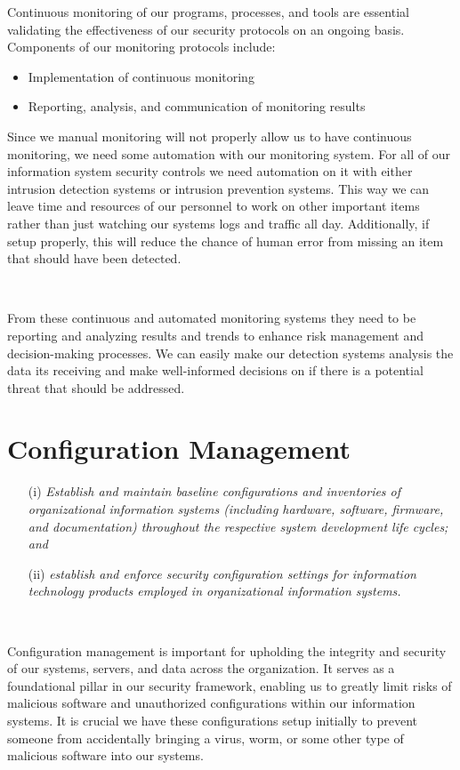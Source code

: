 \documentclass[12pt,a4paper]{report}
\begin{document}
Continuous monitoring of our programs, processes, and tools are essential validating the effectiveness of our security protocols on an ongoing basis. 
Components of our monitoring protocols include:
\begin{itemize}
 \item Implementation of continuous monitoring
 \item Reporting, analysis, and communication of monitoring results
\end{itemize}

Since we manual monitoring will not properly allow us to have continuous monitoring, we need some automation with our monitoring system.
For all of our information system security controls we need automation on it with either intrusion detection systems or intrusion prevention systems.
This way we can leave time and resources of our personnel to work on other important items rather than just watching our systems logs and traffic all day.
Additionally, if setup properly, this will reduce the chance of human error from missing an item that should have been detected.

\

From these continuous and automated monitoring systems they need to be reporting and analyzing results and trends to enhance risk management and decision-making processes.
We can easily make our detection systems analysis the data its receiving and make well-informed decisions on if there is a potential threat that should be addressed. 

\chapter{Configuration Management}
\begin{enumerate}
 \item[(i)] \textit{Establish and maintain baseline configurations and inventories of organizational information systems (including hardware, software, firmware, and documentation) throughout the respective system development life cycles; and}
 \item[(ii)] \textit{establish and enforce security configuration settings for information technology products employed in organizational information systems.}
\end{enumerate}

\

Configuration management is important for upholding the integrity and security of our systems, servers, and data across the organization. 
It serves as a foundational pillar in our security framework, enabling us to greatly limit risks of malicious software and unauthorized configurations within our information systems.
It is crucial we have these configurations setup initially to prevent someone from accidentally bringing a virus, worm, or some other type of malicious software into our systems.
\end{document}
